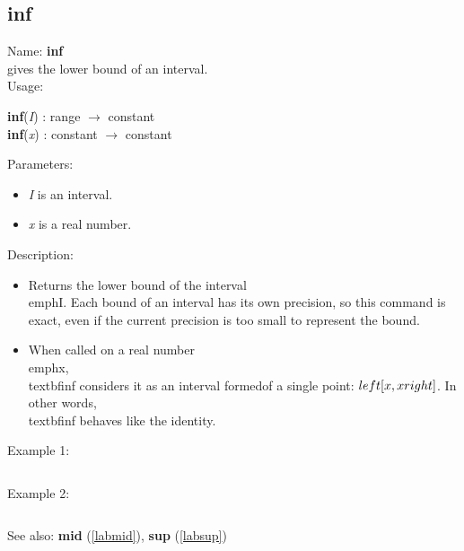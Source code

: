 \subsection{inf}
\label{labinf}
\noindent Name: \textbf{inf}\\
gives the lower bound of an interval.\\
\noindent Usage: 
\begin{center}
\textbf{inf}(\emph{I}) : \textsf{range} $\rightarrow$ \textsf{constant}\\
\textbf{inf}(\emph{x}) : \textsf{constant} $\rightarrow$ \textsf{constant}\\
\end{center}
Parameters: 
\begin{itemize}
\item \emph{I} is an interval.
\item \emph{x} is a real number.
\end{itemize}
\noindent Description: \begin{itemize}

\item Returns the lower bound of the interval \\emph{I}. Each bound of an interval has its \n   own precision, so this command is exact, even if the current precision is too \n   small to represent the bound.\n
\item When called on a real number \\emph{x}, \\textbf{inf} considers it as an interval formed\n   of a single point: $\\left[ x, x \\right]$. In other words, \\textbf{inf} behaves like the identity.\n\end{itemize}
\noindent Example 1: 
\begin{center}\begin{minipage}{15cm}\begin{Verbatim}[frame=single]
\end{Verbatim}
\end{minipage}\end{center}
\noindent Example 2: 
\begin{center}\begin{minipage}{15cm}\begin{Verbatim}[frame=single]
\end{Verbatim}
\end{minipage}\end{center}
See also: \textbf{mid} (\ref{labmid}), \textbf{sup} (\ref{labsup})
